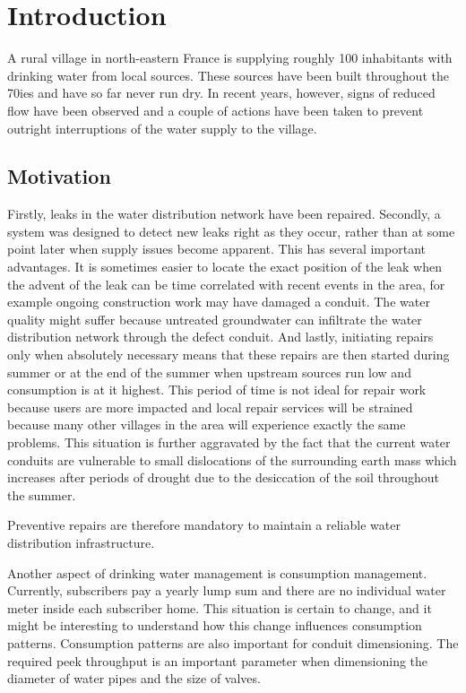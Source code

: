 \chapter{Introduction}


A rural village in north-eastern France is supplying roughly 100 inhabitants with drinking water from local sources.
These sources have been built throughout the 70ies and have so far never run dry.
In recent years, however, signs of reduced flow have been observed and a couple of actions have been taken
to prevent outright interruptions of the water supply to the village.

\section{Motivation}
Firstly, leaks in the water distribution network have been repaired. Secondly, a system was designed to
detect new leaks right as they occur, rather than at some point later when supply issues become apparent.
This has several important advantages. It is sometimes easier to locate the exact position of the leak when
the advent of the leak can be time correlated with recent events in the area, for example ongoing construction
work may have damaged a conduit. The water quality might suffer because untreated groundwater
can infiltrate the water distribution network through the defect conduit.
And lastly, initiating repairs only when absolutely necessary means that these repairs are then
started during summer or at the end of the summer when  upstream sources run low and consumption is at it
highest.
This period of time is not ideal for repair work because users are more  impacted  and local repair services will be
strained because many other villages in the area will experience exactly the same problems.
This situation is further aggravated by the fact that the current water conduits are vulnerable to
small dislocations of the surrounding earth mass which increases after periods of drought due
to the desiccation of the soil throughout the summer.

Preventive repairs are therefore mandatory to maintain a reliable water distribution infrastructure.

Another aspect of drinking water management is consumption management. Currently, subscribers pay a yearly
lump sum and there are no individual water meter inside each subscriber home. This situation is certain
to change, and it might be interesting to understand how this change influences consumption patterns.
Consumption patterns are also important for conduit dimensioning. The required peek throughput is an
important parameter when dimensioning the diameter of water pipes and the size of valves.

